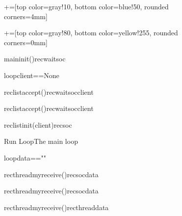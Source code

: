 \documentclass{article}
\begin{document}
	
		
\begin{figure}
	\centering
	
	
	\begin{sequencediagram}[.9]
		+=[top color=gray!10, bottom color=blue!50, rounded corners=4mm]
		
		+=[top color=gray!80, bottom color=yellow!255, rounded corners=0mm] 
		
		
		\begin{messcall}{main}{init()}{recwaitsoc}{}		
		\end{messcall}		
		\begin{sdblock}{loop}{client==None}
			\begin{call}{reclist}{accept()}{recwaitsoc}{client}
			\end{call}
		\end{sdblock}
		\begin{call}{reclist}{accept()}{recwaitsoc}{client}
		\end{call}		
		\begin{messcall}{reclist}{init(client)}{recsoc}{}
		\end{messcall}			
		\begin{sdblock}[green!20]{Run Loop}{The main loop}
			\begin{sdblock}{loop}{data==""}
				\begin{call}{recthread}{myreceive()}{recsoc}{data}
				\end{call}		
			\end{sdblock}	
			\begin{call}{recthread}{myreceive()}{recsoc}{data}
			\end{call}					
			\begin{call}{recthread}{myreceive()}{recthread}{data}
			\end{call}
		\end{sdblock}		

		
		
		

	\end{sequencediagram}

\end{figure}	
	
\end{document}
